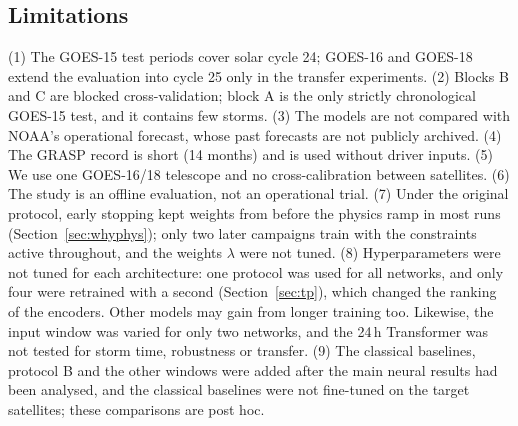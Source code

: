 \documentclass[a4paper,fleqn]{cas-dc}
\begin{document}
\subsection{Limitations}
(1) The GOES-15 test periods cover solar cycle 24; GOES-16 and GOES-18 extend the evaluation into cycle 25 only
in the transfer experiments. (2) Blocks B and C are blocked cross-validation; block A is the only strictly
chronological GOES-15 test, and it contains few storms. (3) The models are not compared with NOAA's operational
forecast, whose past forecasts are not publicly archived. (4) The GRASP record is short (14 months) and is used
without driver inputs. (5) We use one GOES-16/18 telescope and no cross-calibration between satellites. (6) The
study is an offline evaluation, not an operational trial. (7) Under the original protocol, early stopping kept weights from before the physics ramp in most runs
(Section~\ref{sec:whyphys}); only two later campaigns train with the constraints active throughout, and the weights
\(\lambda\) were not tuned. (8) Hyperparameters were not tuned for each architecture: one protocol was used for all
networks, and only four were retrained with a second (Section~\ref{sec:tp}), which changed the ranking of the
encoders. Other models may gain from longer training too. Likewise, the input window was varied for only two
networks, and the 24\,h Transformer was not tested for storm time, robustness or transfer. (9) The classical
baselines, protocol B and the other windows were added after the main neural results had been analysed, and the
classical baselines were not fine-tuned on the target satellites; these comparisons are post hoc.

\end{document}
